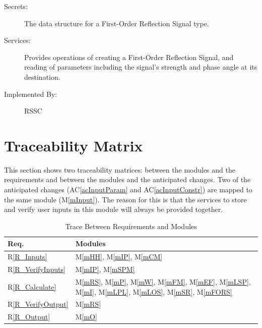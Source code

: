 \documentclass[12pt, titlepage]{article}
\newcommand{\acref}[1]{AC\ref{#1}}
\newcommand{\mref}[1]{M\ref{#1}}
\begin{document}
\begin{description}
\item[Secrets:]The data structure for a First-Order Reflection Signal type.
\item[Services:]Provides operations of creating a First-Order Reflection Signal, and reading of parameters including the signal's strength and phase angle at its destination. 
\item[Implemented By:] RSSC
\end{description}

\section{Traceability Matrix} \label{SecTM}

This section shows two traceability matrices: between the modules and the
requirements and between the modules and the anticipated changes. Two of the anticipated changes (\acref{acInputParam} and \acref{acInputConstr}) are mapped to the same module (\mref{mInput}). The reason for this is that the services to store and verify user inputs in this module will always be provided together.


\begin{table}[H]
\centering
\begin{tabular}{p{} p{}}
\toprule
\textbf{Req.} & \textbf{Modules}\\
\midrule
R\ref{R_Inputs} & \mref{mHH}, \mref{mIP}, \mref{mCM}\\
R\ref{R_VerifyInputs} & \mref{mIP}, \mref{mSPM}\\
R\ref{R_Calculate} & \mref{mRS}, \mref{mP}, \mref{mW}, \mref{mFM}, \mref{mEF}, \mref{mLSP}, \mref{mI}, \mref{mLPL}, \mref{mLOS}, \mref{mSR}, \mref{mFORS}\\
R\ref{R_VerifyOutput} & \mref{mRS}\\
R\ref{R_Output} & \mref{mO}\\
\bottomrule
\end{tabular}
\caption{Trace Between Requirements and Modules}
\label{TblRT}
\end{table}
\end{document}
